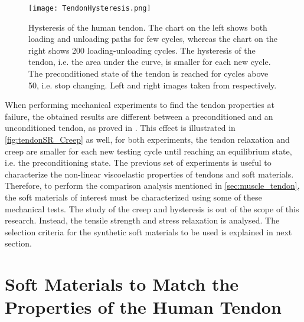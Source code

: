 \begin{figure}[htb!]
    \centering
    \texttt{[image: TendonHysteresis.png]}
    \caption{Hysteresis of the human tendon. The chart on the left shows both loading and unloading paths for few cycles, whereas the chart on the right shows 200 loading-unloading cycles. The hysteresis of the tendon, i.e. the area under the curve, is smaller for each new cycle. The preconditioned state of the tendon is reached for cycles above 50, i.e. stop changing. Left and right images taken from \cite{maurel1998biomechanical,schatzmann1998effect} respectively. }
    \label{fig:tendonHysteresis}
\end{figure}

When performing mechanical experiments to find the tendon properties at failure, the obtained results are different between a preconditioned and an unconditioned tendon, as proved in \cite{schatzmann1998effect}. This effect is illustrated in \autoref{fig:tendonSR_Creep} as well, for both experiments, the tendon relaxation and creep are smaller for each new testing cycle until reaching an equilibrium state, i.e. the preconditioning state. The previous set of experiments is useful to characterize the non-linear viscoelastic properties of tendons and soft materials. Therefore, to perform the comparison analysis mentioned in \autoref{sec:muscle_tendon}, the soft materials of interest must be characterized using some of these mechanical tests. The study of the creep and hysteresis is out of the scope of this research. Instead, the tensile strength and stress relaxation is analysed. The selection criteria for the synthetic soft materials to be used is explained in next section.

\section{Soft Materials to Match the Properties of the Human Tendon}

